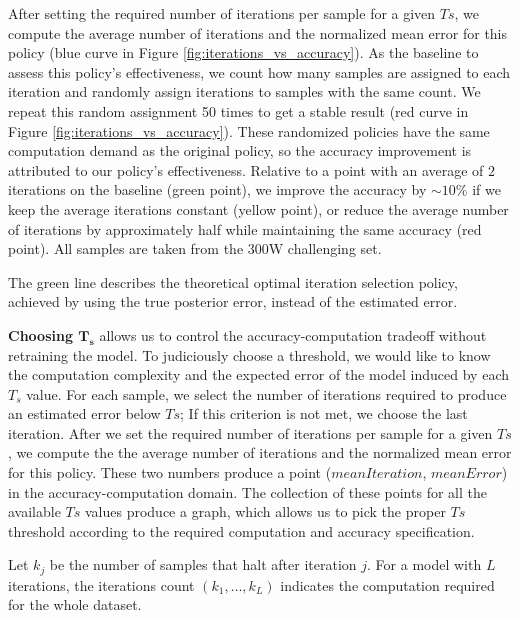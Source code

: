 \documentclass[9pt,twocolumn]{extarticle}
\begin{document}
After setting the required number of iterations per sample for a given $Ts$, we compute the average number of iterations and the normalized mean error for this policy (blue curve in Figure \ref{fig:iterations_vs_accuracy}). As the baseline to assess this policy's effectiveness, we count how many samples are assigned to each iteration and randomly assign iterations to samples with the same count. We repeat this random assignment 50 times to get a stable result (red curve in Figure \ref{fig:iterations_vs_accuracy}). These randomized policies have the same computation demand as the original policy, so the accuracy improvement is attributed to our policy's effectiveness. Relative to a point with an average of $2$ iterations on the baseline (green point), we improve the accuracy by $\sim10\%$ if we keep the average iterations constant (yellow point), or reduce the average number of iterations by approximately half while maintaining the same accuracy (red point). All samples are taken from the 300W challenging set.

The green line describes the theoretical optimal iteration selection policy, achieved by using the true posterior error, instead of the estimated error.

\iffalse
\textbf{Choosing $\mathbf{T_s}$} allows us to control the accuracy-computation tradeoff without retraining the model. To judiciously choose a threshold, we would like to know the computation complexity and the expected error of the model induced by each $T_s$ value. For each sample, we select the number of iterations required to produce an estimated error below $Ts$; If this criterion is not met, we choose the last iteration.
After we set the required number of iterations per sample for a given $Ts$, we compute the the average number of iterations and the normalized mean error for this policy. These two numbers produce a point ($meanIteration$, $mean Error$) in the accuracy-computation domain. The collection of these points for all the available $Ts$ values produce a graph, which allows us to pick the proper $Ts$ threshold according to the required computation and accuracy specification.


Let $k_j$ be the number of samples that halt after iteration $j$. For a model with $L$ iterations, the iterations count $(k_1,\ldots,k_L)$   indicates the computation required for the whole dataset.
\end{document}
